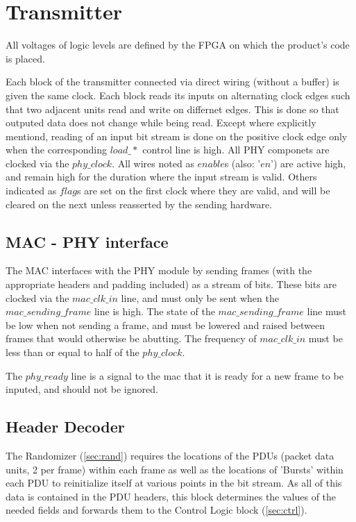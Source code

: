 \documentclass[10pt]{article}
\begin{document}
\section{Transmitter}
All voltages of logic levels are defined by the FPGA on which the product's
code is placed.

Each block of the transmitter connected via direct wiring (without a buffer) is
given the same clock. Each block reads its inputs on alternating clock edges
such that two adjacent units read and write on differnet edges. This is done so
that outputed data does not change while being read. Except where explicitly
mentiond, reading of an input bit stream is done on the positive clock edge
only when the corresponding $load\_*$ control line is high. All PHY componets
are clocked via the $phy\_clock$. All wires noted as $enable$s (also: '$en$')
are active high, and remain high for the duration where the input stream is
valid. Others indicated as $flag$s are set on the first clock where they are
valid, and will be cleared on the next unless reasserted by the sending
hardware.

	\subsection{MAC - PHY interface}
	\label{sec:mac_phy}
	The MAC interfaces with the PHY module by sending frames (with the
	appropriate headers and padding included) as a stream of bits. These
	bits are clocked via the $mac\_clk\_in$ line, and must only be sent
	when the $mac\_sending\_frame$ line is high. The state of the
	$mac\_sending\_frame$ line must be low when not sending a frame, and
	must be lowered and raised between frames that would otherwise be
	abutting. The frequency of $mac\_clk\_in$ must be less than or equal
	to half of the $phy\_clock$.

	The $phy\_ready$ line is a signal to the mac that it is ready for a
	new frame to be inputed, and should not be ignored.

	\subsection{Header Decoder}
	\label{sec:header}
	The Randomizer (\autoref{sec:rand}) requires the locations of the
	PDUs (packet data units, 2 per frame) within each frame as well as the
	locations of 'Bursts' within each PDU to reinitialize itself at
	various points in the bit stream. As all of this data is contained in
	the PDU headers, this block determines the values of the needed fields
	and forwards them to the Control Logic block (\autoref{sec:ctrl}). 
\end{document}

